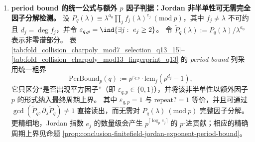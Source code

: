 \begin{enumerate}
  \item \textbf{period bound 的统一公式与额外 \texorpdfstring{$p$}{p} 因子判据：Jordan 非半单性可无需完全因子分解检测。}
  设
  \(P_q(\lambda)\equiv \lambda^{a_0}\prod_j f_j(\lambda)^{e_j}\ (\mathrm{mod}\ p)\)，其中 \(f_j\neq \lambda\) 不可约且 \(d_j=\deg f_j\)，并令 \(\varepsilon_{q,p}=\ind\{\exists j:\ e_j\ge 2\}\)。
  令 \(\widetilde P_q(\lambda):=P_q(\lambda)/\lambda^{a_0}\) 表示非零谱部分。
  表 \ref{tab:fold_collision_charpoly_mod7_selection_q13_15}--\ref{tab:fold_collision_charpoly_mod13_fingerprint_q13} 的 \emph{period bound} 列采用统一粗界
  \[
  \mathrm{PerBound}_p(q):=p^{\varepsilon_{q,p}}\cdot \mathrm{lcm}_j(p^{d_j}-1),
  \]
  它只区分“是否出现平方因子”（即 \(\varepsilon_{q,p}\in\{0,1\}\)），并将该非半单性以额外因子 \(p\) 的形式纳入最终周期上界。
  其中 \(\varepsilon_{q,p}=1\) 与 \(\mathrm{repeat?}=1\) 等价，并且可通过 \(\gcd(\widetilde P_q,\partial_\lambda\widetilde P_q)\neq 1\) 直接读出，而无需对 \(P_q(\lambda)\ (\mathrm{mod}\ p)\) 完整因子分解。
  更精细地，Jordan 指数 \(e_j\) 的数量级会产生 \(p^{\lceil\log_p e_j\rceil}\) 的 \(p\)-进贡献；相应的精确周期上界见命题 \ref{prop:conclusion-finitefield-jordan-exponent-period-bound}。
\end{enumerate}

